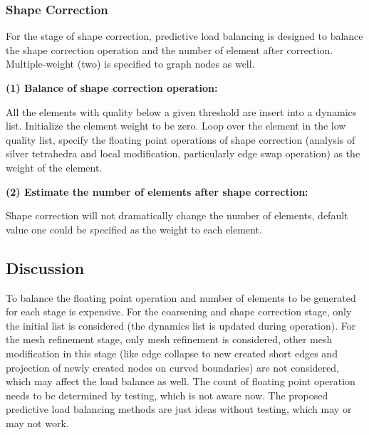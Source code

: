 \subsubsection{Shape Correction}

For the stage of shape correction, predictive load balancing is
designed to balance the shape correction operation and the number of
element after correction. Multiple-weight (two) is specified to graph nodes
as well.

{\bf (1) Balance of shape correction operation:}

All the elements with quality below a given threshold are insert into
a dynamics list. Initialize the element weight to be zero. Loop over
the element in the low quality list, specify the floating point
operations of shape correction (analysis of silver tetrahedra and local
modification, particularly edge swap operation) as the weight of the
element.

{\bf (2) Estimate the number of elements after shape correction:}

Shape correction will not dramatically change the number of elements,
default value one could be specified as the weight to each element.

\subsection{Discussion}
To balance the floating point operation and number of elements to be
generated for each stage is expensive. For the coarsening and shape
correction stage, only the initial list is considered (the dynamics
list is updated during operation). For the mesh refinement stage, only
mesh refinement is considered, other mesh modification in this stage
(like edge collapse to new created short edges and projection of newly
created nodes on curved boundaries) are not considered, which may
affect the load balance as well. The count of floating point operation
needs to be determined by testing, which is not aware now. The
proposed predictive load balancing methods are just ideas without
testing, which may or may not work. 

%
